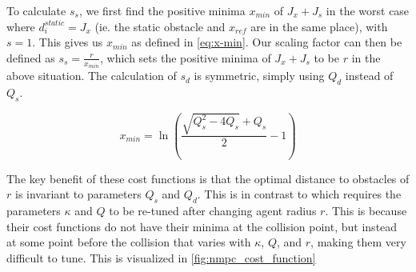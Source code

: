 To calculate $s_s$, we first find the positive minima $x_{min}$ of $J_x + J_s$ in the worst case where $d_i^{static} = J_x$ (ie. the static obstacle and $x_{ref}$ are in the same place), with $s=1$. This gives us $x_{min}$ as defined in \autoref{eq:x-min}. Our scaling factor can then be defined as $s_s = \frac{r}{x_{min}}$, which sets the positive minima of $J_x + J_s$ to be $r$ in the above situation. The calculation of $s_d$ is symmetric, simply using $Q_d$ instead of $Q_s$.

\begin{equation} \label{eq:x-min}
    x_{min} = \ln \left( \frac{\sqrt{Q_s^2-4Q_s}+Q_s}{2}-1 \right)
\end{equation}

The key benefit of these cost functions is that the optimal distance to obstacles of $r$ is invariant to parameters $Q_s$ and $Q_d$. This is in contrast to \autocite{DBLP:journals/corr/KamelASN17} which requires the parameters $\kappa$ and $Q$ to be re-tuned after changing agent radius $r$. This is because their cost functions do not have their minima at the collision point, but instead at some point before the collision that varies with $\kappa$, $Q$, and $r$, making them very difficult to tune. This is visualized in \autoref{fig:nmpc_cost_function}

